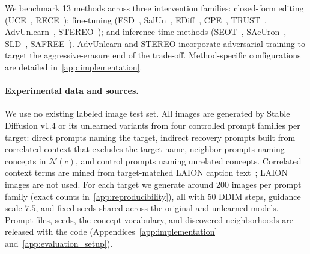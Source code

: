 
We benchmark 13 methods across three intervention families: closed-form editing
(UCE~\citep{gandikota2024unified}, RECE~\citep{gong2024reliable});
fine-tuning
(ESD~\citep{gandikota2023erasing}, SalUn~\citep{fan2023salun},
EDiff~\citep{wu2024erasediff}, CPE~\citep{lee2025concept},
TRUST~\citep{kori2026selective}, AdvUnlearn~\citep{zhang2024defensive},
STEREO~\citep{srivatsan2025stereo}); and inference-time methods
(SEOT~\citep{li2024get}, SAeUron~\citep{cywinski2025saeuron},
SLD~\citep{schramowski2023safe}, SAFREE~\citep{yoon2025safree}).
AdvUnlearn and STEREO incorporate adversarial training to target the aggressive-erasure end of the trade-off. Method-specific configurations are detailed in~\cref{app:implementation}.

\paragraph{Experimental data and sources.} We use no existing labeled image test set. All images are generated by Stable Diffusion v1.4 or its unlearned variants from four controlled prompt families per target: direct prompts naming the target, indirect recovery prompts built from correlated context that excludes the target name, neighbor prompts naming concepts in $\mathcal{N}(c)$, and control prompts naming unrelated concepts. Correlated context terms are mined from target-matched LAION caption text~\citep{schuhmann2022laion}; LAION images are not used. For each target we generate around 200 images per prompt family (exact counts in~\cref{app:reproducibility}), all with 50 DDIM steps, guidance scale $7.5$, and fixed seeds shared across the original and unlearned models. Prompt files, seeds, the concept vocabulary, and discovered neighborhoods are released with the code (Appendices~\ref{app:implementation} and~\ref{app:evaluation_setup}).


